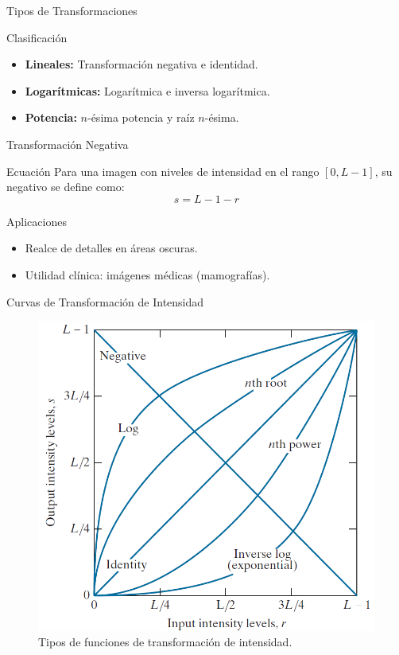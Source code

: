 \documentclass{beamer}
\begin{document}
\begin{frame}{Tipos de Transformaciones}
\begin{block}{Clasificación}
\begin{itemize}
    \item \textbf{Lineales:} Transformación negativa e identidad.
    \item \textbf{Logarítmicas:} Logarítmica e inversa logarítmica.
    \item \textbf{Potencia:} \( n \)-ésima potencia y raíz \( n \)-ésima.
\end{itemize}
\end{block}
\end{frame}

\begin{frame}{Transformación Negativa}
\begin{block}{Ecuación}
Para una imagen con niveles de intensidad en el rango \( [0, L-1] \), su negativo se define como:
\[
s = L - 1 - r \tag{3-3}
\]
\end{block}
\pause
\begin{alertblock}{Aplicaciones}
\begin{itemize}
    \item Realce de detalles en áreas oscuras.
    \item Utilidad clínica: imágenes médicas (mamografías).
\end{itemize}
\end{alertblock}
\end{frame}

\begin{frame}{Curvas de Transformación de Intensidad}
\begin{figure}
\includegraphics[width=0.5\linewidth]{figuras/Fig_3_3.png}
\caption{Tipos de funciones de transformación de intensidad.}
\end{figure}
\end{frame}
\end{document}
